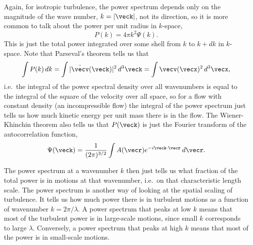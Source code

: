 Again, for isotropic turbulence, the power spectrum depends only on the magnitude of the wave number, $k=|\veck|$, not its direction, so it is more common to talk about the power per unit radius in $k$-space,
\begin{equation}
P(k) = 4\pi k^2 \Psi(k).
\end{equation}
This is just the total power integrated over some shell from $k$ to $k+dk$ in $k$-space. Note that Parseval's theorem tells us that
\begin{equation}
\int P(k)\, dk = \int | \tilde{\vecv}(\veck)|^2 \, d^3\veck = \int \vecv(\vecx)^2 \, d^3\vecx,
\end{equation}
i.e.\ the integral of the power spectral density over all wavenumbers is equal to the integral of the square of the velocity over all space, so for a flow with constant density (an incompressible flow) the integral of the power spectrum just tells us how much kinetic energy per unit mass there is in the flow. The Wiener-Khinchin theorem also tells us that $P(\veck)$ is just the Fourier transform of the autocorrelation function,
\begin{equation}
\Psi(\veck) = \frac{1}{(2\pi)^{3/2}} \int A(\vecr) e^{-i\veck\cdot\vecr} \,d\vecr.
\end{equation}

The power spectrum at a wavenumber $k$ then just tells us what fraction of the total power is in motions at that wavenumber, i.e.\ on that characteristic length scale. The power spectrum is another way of looking at the spatial scaling of turbulence. It tells us how much power there is in turbulent motions as a function of wavenumber $k=2\pi/\lambda$. A power spectrum that peaks at low $k$ means that most of the turbulent power is in large-scale motions, since small $k$ corresponds to large $\lambda$. Conversely, a power spectrum that peaks at high $k$ means that most of the power is in small-scale motions.

